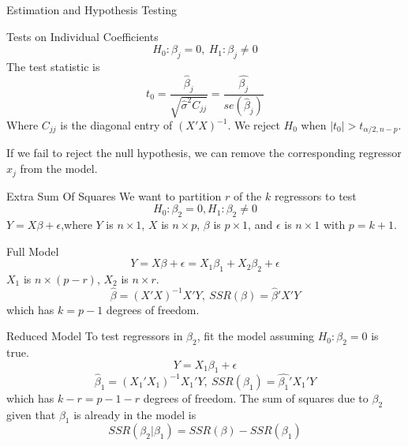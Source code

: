 \documentclass{article}
\begin{document}
\begin{multicols*}{3}
\begin{blackbox}{Estimation and Hypothesis Testing}
\begin{bluebox}{Tests on Individual Coefficients}
            \[H_0: \beta_j = 0, \ H_1: \beta_j \neq 0\]
            The test statistic is \\[-1ex]
            \[t_0 = \frac{\hat{\beta}_j}{\sqrt{\hat{\sigma}^2C_{jj}}} = \frac{\hat{\beta_j}}{se(\hat{\beta}_j)}\]
            Where $C_{jj}$ is the diagonal entry of $(X'X)^{-1}$. We reject $H_0$ when $|t_0| > t_{\alpha/2, n-p}$.
        \end{bluebox}
        If we fail to reject the null hypothesis, we can remove the corresponding regressor $x_j$ from the model.
    \end{blackbox}
    \begin{blackbox}{Extra Sum Of Squares}
        We want to partition $r$ of the $k$ regressors to test \\[-2ex]
        \[H_0: \beta_2 = 0, H_1: \beta_2 \neq 0\]
        $Y = X\beta + \epsilon$,where $Y$ is $n\times 1$, $X$ is $n\times p$, $\beta$ is $p\times 1$, and $\epsilon$ is $n \times 1$ with $p = k+1$.
        \begin{redbox}{Full Model}
            \[Y = X\beta + \epsilon = X_1\beta_1 + X_2\beta_2 + \epsilon\] 
            $X_1$ is $n \times (p-r)$, $X_2$ is $n\times r$.\\[-2ex]
           \[\hat{\beta} = (X'X)^{-1}X'Y, \ SSR(\beta) = \hat{\beta}'X'Y\]
           which has $k = p-1$ degrees of freedom.
        \end{redbox}
        \begin{brownbox}{Reduced Model}
            To test regressors in $\beta_2$, fit the model assuming $H_0: \beta_2 = 0$ is true. \\[-3ex]
            \[Y = X_1\beta_1 + \epsilon\]
            \[\hat{\beta}_1 = (X_1'X_1)^{-1}X_1'Y, \ SSR(\beta_1) = \hat{\beta_1}'X_1'Y\]
            which has $k-r = p - 1 - r$ degrees of freedom. The sum of squares due to $\beta_2$ given that $\beta_1$ is already in the model is \\[-3ex]
            \[SSR(\beta_2 | \beta_1) = SSR(\beta) - SSR(\beta_1)\]
        \end{brownbox}
            

\end{blackbox}
\end{multicols*}
\end{document}

